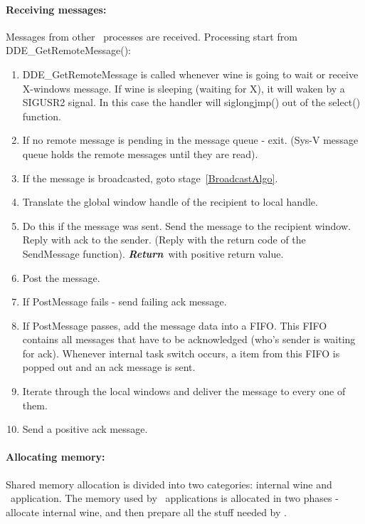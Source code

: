 \paragraph{Receiving messages:}
Messages from other \Wine\ processes are received. Processing start
from DDE\_GetRemoteMessage():
\begin{enumerate}
  \item DDE\_GetRemoteMessage is called whenever wine is going to wait
    or receive X-windows message. If wine is sleeping (waiting for X),
    it will waken by a SIGUSR2 signal. In this case the handler will
    siglongjmp() out of the select() function.
  \item If no remote message is pending in the message queue - exit.
    (Sys-V message queue holds the remote messages until they are
    read).
  \item If the message is broadcasted, goto stage~\ref{BroadcastAlgo}.
  \item Translate the global window handle of the recipient to local
    handle. 
  \item Do this if the message was sent. Send the message to the
    recipient window. Reply with ack to the sender. (Reply with the
    return code of the SendMessage function). {\em \bf Return}\ with
    positive return value.
  \item Post the message.
  \item If PostMessage fails - send failing ack message. 
  \item If PostMessage passes, add the message data into a FIFO\@. This
    FIFO contains all messages that have to be acknowledged (who's
    sender is waiting for ack). Whenever internal task switch occurs,
    a item from this FIFO is popped out and an ack message is sent.  
  \item \label{BroadcastAlgo} Iterate through the local windows and
    deliver the message to every one of them.
  \item Send a positive ack message.
\end{enumerate}

\paragraph{Allocating memory:}
Shared memory allocation is divided into two categories: internal wine
and \windoz\ application. The memory used by \windoz\ applications is
allocated in two phases - allocate internal wine, and then prepare all
the stuff needed by \windoz.


